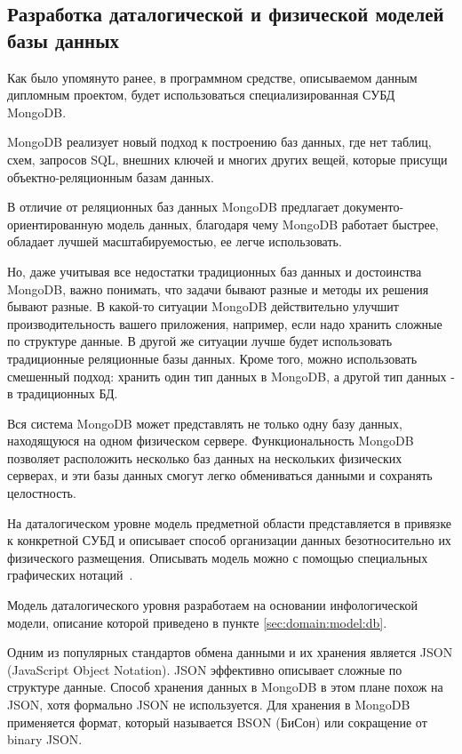 \subsection{Разработка даталогической и физической моделей базы данных}
\label{sec:design:db}

Как было упомянуто ранее, в программном средстве, описываемом данным дипломным проектом, будет использоваться специализированная СУБД MongoDB.

MongoDB реализует новый подход к построению баз данных, где нет таблиц, схем, запросов SQL, внешних ключей и многих других вещей, которые присущи объектно-реляционным базам данных.

В отличие от реляционных баз данных MongoDB предлагает документо-ориентированную модель данных, благодаря чему MongoDB работает быстрее, обладает лучшей масштабируемостью, ее легче использовать.

Но, даже учитывая все недостатки традиционных баз данных и достоинства MongoDB, важно понимать, что задачи бывают разные и методы их решения бывают разные. В какой-то ситуации MongoDB действительно улучшит производительность вашего приложения, например, если надо хранить сложные по структуре данные. В другой же ситуации лучше будет использовать традиционные реляционные базы данных. Кроме того, можно использовать смешенный подход: хранить один тип данных в MongoDB, а другой тип данных - в традиционных БД.

Вся система MongoDB может представлять не только одну базу данных, находящуюся на одном физическом сервере. Функциональность MongoDB позволяет расположить несколько баз данных на нескольких физических серверах, и эти базы данных смогут легко обмениваться данными и сохранять целостность.

На даталогическом уровне модель предметной области представляется в привязке к конкретной СУБД и описывает способ организации данных безотносительно их физического размещения. Описывать модель можно с помощью специальных графических нотаций~\cite{kulikov_db_workbook}. 

Модель даталогического уровня разработаем на основании инфологической модели, описание которой приведено в пункте \ref{sec:domain:model:db}. 

Одним из популярных стандартов обмена данными и их хранения является JSON (JavaScript Object Notation). JSON эффективно описывает сложные по структуре данные. Способ хранения данных в MongoDB в этом плане похож на JSON, хотя формально JSON не используется. Для хранения в MongoDB применяется формат, который называется BSON (БиСон) или сокращение от binary JSON.

